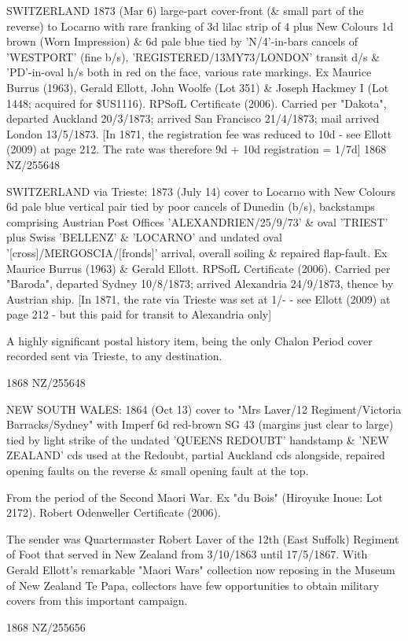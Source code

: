 \documentclass[justified]{tufte-book}
\begin{document}
%
{SWITZERLAND 1873 (Mar 6) large-part cover-front (\& small part of the reverse) to Locarno with rare franking of 3d lilac strip of 4 plus New Colours 1d brown (Worn Impression) \& 6d pale blue tied by 'N/4'-in-bars cancels of 'WESTPORT' (fine b/s), 'REGISTERED/13MY73/LONDON' transit d/s \& 'PD'-in-oval h/s both in red on the face, various rate markings. Ex Maurice Burrus (1963), Gerald Ellott, John Woolfe (Lot 351) \& Joseph Hackmey I (Lot 1448; acquired for \$US1116). RPSofL Certificate (2006). Carried per "Dakota", departed Auckland 20/3/1873; arrived San Francisco 21/4/1873; mail arrived London 13/5/1873. [In 1871, the registration fee was reduced to 10d - see Ellott (2009) at page 212. The rate was therefore 9d + 10d registration = 1/7d]}%
{1868}%
{NZ/255648}%
{}%
{}
{}%
{}

%
{SWITZERLAND via Trieste: 1873 (July 14) cover to Locarno with New Colours 6d pale blue vertical pair tied by poor cancels of Dunedin (b/s), backstamps comprising Austrian Post Offices 'ALEXANDRIEN/25/9/73' \& oval 'TRIEST' plus Swiss 'BELLENZ' \& 'LOCARNO' and undated oval '[cross]/MERGOSCIA/[fronds]' arrival, overall soiling \& repaired flap-fault. Ex Maurice Burrus (1963) \& Gerald Ellott. RPSofL Certificate (2006). Carried per "Baroda", departed Sydney 10/8/1873; arrived Alexandria 24/9/1873, thence by Austrian ship. [In 1871, the rate via Trieste was set at 1/- - see Ellott (2009) at page 212 - but this paid for transit to Alexandria only] 

A highly significant postal history item, being the only Chalon Period cover recorded sent via Trieste, to any destination.\label{trieste}}%
{1868}%
{NZ/255648}%
{}%
{}
{}%
{}


%
{NEW SOUTH WALES: 1864 (Oct 13) cover to "Mrs Laver/12 Regiment/Victoria Barracks/Sydney" with Imperf 6d red-brown SG 43 (margins just clear to large) tied by light strike of the undated 'QUEENS REDOUBT' handstamp \& 'NEW ZEALAND' cds used at the Redoubt, partial Auckland cds alongside, repaired opening faults on the reverse \& small opening fault at the top. 

From the period of the Second Maori War. Ex "du Bois" (Hiroyuke Inoue: Lot 2172). Robert Odenweller Certificate (2006).

The sender was Quartermaster Robert Laver of the 12th (East Suffolk) Regiment of Foot that served in New Zealand from 3/10/1863 until 17/5/1867. With Gerald Ellott's remarkable "Maori Wars" collection now reposing in the Museum of New Zealand Te Papa, collectors have few opportunities to obtain military covers from this important campaign.}%
{1868}%
{NZ/255656}%
{}%
{}
{}%
{}
\end{document}
